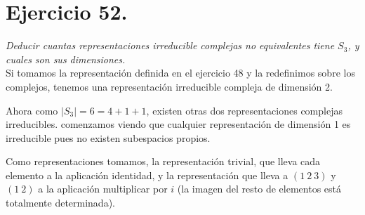 \section{Ejercicio 52.} \emph{ Deducir cuantas representaciones irreducible complejas no equivalentes tiene \(S_{3}\), y cuales son sus dimensiones. }\\

Si tomamos la representación definida en el ejercicio 48 y la redefinimos sobre los complejos, tenemos una representación irreducible compleja de dimensión 2.

Ahora como \(|S_{3}| = 6 = 4+1+1\),  existen otras dos representaciones complejas irreducibles. comenzamos viendo que cualquier representación de dimensión 1 es irreducible pues no existen subespacios propios.

Como representaciones tomamos, la representación trivial, que lleva cada elemento a la aplicación identidad, y la representación que lleva a \((1\ 2\ 3)\) y \((1 \ 2)\) a la aplicación multiplicar por \(i\) (la imagen del resto de elementos está totalmente determinada).
